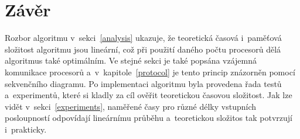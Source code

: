 \documentclass[a4paper, 12pt]{article}[21.3.2015]
\begin{document}
\section{Závěr}\label{conclusion}
Rozbor algoritmu v~sekci~\ref{analysis} ukazuje, že teoretická časová i~paměťová složitost algoritmu jsou lineární, což při použití daného počtu procesorů dělá algoritmus také optimálním. Ve stejné sekci je také popsána vzájemná komunikace procesorů a~v~kapitole~\ref{protocol} je tento princip znázorněn pomocí sekvenčního diagramu. Po implementaci algoritmu byla provedena řada testů a~experimentů, které si kladly za cíl ověřit teoretickou časovou složitost. Jak lze vidět v~sekci~\ref{experiments}, naměřené časy pro různé délky vstupních posloupností odpovídají lineárnímu průběhu a~teoretickou složitos tak potvrzují i~prakticky.
\end{document}

